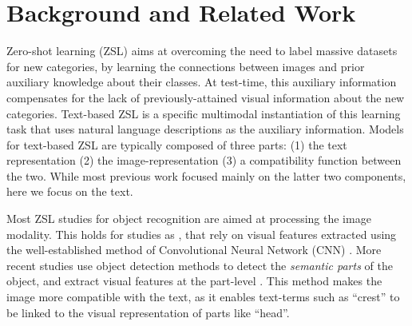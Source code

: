 \documentclass[11pt,a4paper]{article}
\newcommand\yuval[1]{\textcolor{darkpink}{\textbf{YUVAL:} #1 }}
\newcommand\tzuf[1]{\textcolor{blue}{\textbf{TZUF:} #1 }}
\newcommand\reut[1]{\textcolor{green}{\textbf{REUT:} #1 }}
\begin{document}
\section{Background and Related Work}
Zero-shot learning (ZSL) %
aims at overcoming the need to label massive datasets for new categories, by learning the connections between images and prior auxiliary knowledge about their classes. At test-time, this auxiliary information compensates for the lack of previously-attained visual information about the new categories.
Text-based ZSL is a specific multimodal instantiation of this learning task that uses natural language descriptions as the auxiliary information. Models for text-based ZSL are typically composed of three parts: (1) the text representation (2) the image-representation (3) a compatibility function between the two.  While most previous work focused mainly on the latter two components, here we %
focus on the text. 

Most ZSL studies  for object recognition are aimed at processing the image modality. This holds for studies as \citet{xu2018attngan,lei2015predicting,qiao2016less,akata2016multi}, that rely on visual features extracted using the well-established method of
Convolutional Neural Network (CNN) \cite{lecun1995convolutional}. More recent studies use object detection methods to detect the {\em semantic parts} of the object, and extract visual features at the part-level \cite{elhoseiny2017link,zhu2018generative,zhang2016spda}. This
method makes the image more compatible with the text, as it enables text-terms such as \enquote{crest} to be linked to the visual representation of parts like \enquote{head}. 
\end{document}
